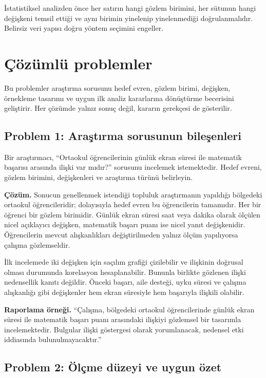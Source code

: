 \begin{assumptionbox}
İstatistiksel analizden önce her satırın hangi gözlem birimini, her sütunun
hangi değişkeni temsil ettiği ve aynı birimin yinelenip yinelenmediği
doğrulanmalıdır. Belirsiz veri yapısı doğru yöntem seçimini engeller.
\end{assumptionbox}

\section{Çözümlü problemler}

Bu problemler araştırma sorusunu hedef evren, gözlem birimi, değişken,
örnekleme tasarımı ve uygun ilk analiz kararlarına dönüştürme becerisini
geliştirir. Her çözümde yalnız sonuç değil, kararın gerekçesi de gösterilir.

\subsection*{Problem 1: Araştırma sorusunun bileşenleri}

Bir araştırmacı, ``Ortaokul öğrencilerinin günlük ekran süresi ile matematik
başarısı arasında ilişki var mıdır?'' sorusunu incelemek istemektedir. Hedef
evreni, gözlem birimini, değişkenleri ve araştırma türünü belirleyin.

\textbf{Çözüm.} Sonucun genellenmek istendiği topluluk araştırmanın yapıldığı
bölgedeki ortaokul öğrencileridir; dolayısıyla hedef evren bu öğrencilerin
tamamıdır. Her bir öğrenci bir gözlem birimidir. Günlük ekran süresi saat veya
dakika olarak ölçülen nicel açıklayıcı değişken, matematik başarı puanı ise
nicel yanıt değişkenidir. Öğrencilerin mevcut alışkanlıkları değiştirilmeden
yalnız ölçüm yapılıyorsa çalışma gözlemseldir.

İlk incelemede iki değişken için saçılım grafiği çizilebilir ve ilişkinin
doğrusal olması durumunda korelasyon hesaplanabilir. Bununla birlikte gözlenen
ilişki nedensellik kanıtı değildir. Önceki başarı, aile desteği, uyku süresi
ve çalışma alışkanlığı gibi değişkenler hem ekran süresiyle hem başarıyla
ilişkili olabilir.

\textbf{Raporlama örneği.} ``Çalışma, bölgedeki ortaokul öğrencilerinde günlük
ekran süresi ile matematik başarı puanı arasındaki ilişkiyi gözlemsel bir
tasarımla incelemektedir. Bulgular ilişki göstergesi olarak yorumlanacak,
nedensel etki iddiasında bulunulmayacaktır.''

\subsection*{Problem 2: Ölçme düzeyi ve uygun özet}

